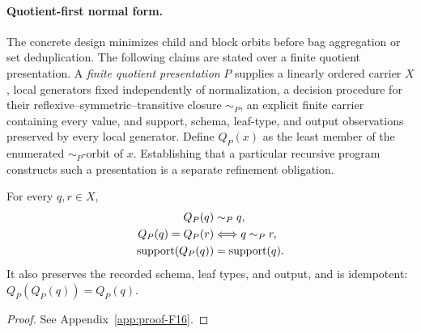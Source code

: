\paragraph{Quotient-first normal form.}
The concrete design minimizes child and block orbits before bag aggregation
or set deduplication.  The following claims are stated over a finite quotient
presentation.  A \emph{finite quotient presentation} $P$ supplies a linearly
ordered carrier $X$, local generators fixed independently of normalization,
a decision procedure for their reflexive--symmetric--transitive closure
$\mathrel{\sim_P}$, an explicit finite carrier containing every value, and
support, schema, leaf-type, and output observations preserved by every local
generator.  Define $Q_P(x)$ as the least member of the enumerated
$\sim_P$-orbit of $x$.  Establishing that a particular recursive program
constructs such a presentation is a separate refinement obligation.

\begin{lemma}
\label{lem:qnf-exact}
For every $q,r\in X$,
\begin{align*}
Q_P(q)&\sim_P q,\\
\leanref{TSG-ATOM-021}{TypedSlottedEGraphsPaper.NormalizationBridge.AmbientQuotientPresentation.quotientNormal_eq_iff}
Q_P(q)=Q_P(r)&\Longleftrightarrow q\sim_P r,\\
\leanref{TSG-ATOM-022}{TypedSlottedEGraphsPaper.NormalizationBridge.AmbientQuotientPresentation.quotientNormal_preserves_support}
\operatorname{support}(Q_P(q))&=\operatorname{support}(q).
\end{align*}
It also preserves the recorded schema, leaf types, and output, and is
idempotent: $Q_P(Q_P(q))=Q_P(q)$.
\end{lemma}
\begin{proof}See Appendix~\ref{app:proof-F16}.\end{proof}

